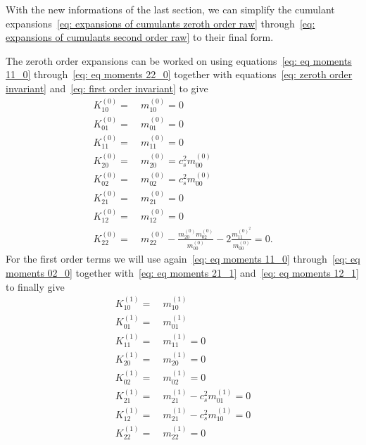 With the new informations of the last section, we can simplify the cumulant expansions~\eqref{eq: expansions of cumulants zeroth order raw} through~\eqref{eq: expansions of cumulants second order raw} to their final form.

The zeroth order expansions can be worked on using equations~\eqref{eq: eq moments 11_0} through~\eqref{eq: eq moments 22_0} together with equations~\eqref{eq: zeroth order invariant} and~\eqref{eq: first order invariant} to give
\begin{equation}
  \label{eq: expansions of cumulants zeroth order}
  \begin{aligned}
    K_{10}^{(0)} =&\ m_{10}^{(0)} = 0\\
    K_{01}^{(0)} =&\ m_{01}^{(0)} = 0\\
    K_{11}^{(0)} =&\ m_{11}^{(0)} = 0\\
    K_{20}^{(0)} =&\ m_{20}^{(0)} = c_s^2 m_{00}^{(0)}\\
    K_{02}^{(0)} =&\ m_{02}^{(0)} = c_s^2 m_{00}^{(0)}\\
    K_{21}^{(0)} =&\ m_{21}^{(0)} = 0\\
    K_{12}^{(0)} =&\ m_{12}^{(0)} = 0\\
    K_{22}^{(0)} =&\ m_{22}^{(0)} - \frac{ m_{20}^{(0)} m_{02}^{(0)} }{m_{00}^{(0)}} - 2\frac{ m_{11}^{{(0)}^2}}{m_{00}^{(0)}} = 0.
  \end{aligned}
\end{equation}
For the first order terms we will use again~\eqref{eq: eq moments 11_0} through~\eqref{eq: eq moments 02_0} together with~\eqref{eq: eq moments 21_1} and~\eqref{eq: eq moments 12_1} to finally give
\begin{equation}
  \label{eq: expansions of cumulants first order}
  \begin{aligned}
    K_{10}^{(1)} =&\ m_{10}^{(1)}\\
    K_{01}^{(1)} =&\ m_{01}^{(1)}\\
    K_{11}^{(1)} =&\ m_{11}^{(1)} = 0 \\
    K_{20}^{(1)} =&\ m_{20}^{(1)} = 0\\
    K_{02}^{(1)} =&\ m_{02}^{(1)} = 0\\
    K_{21}^{(1)} =&\ m_{21}^{(1)}
    - c_s^2 m_{01}^{(1)} = 0 \\
    K_{12}^{(1)} =&\ m_{21}^{(1)}
    - c_s^2 m_{10}^{(1)} = 0 \\
    K_{22}^{(1)} =&\ m_{22}^{(1)} = 0
  \end{aligned}
\end{equation}
